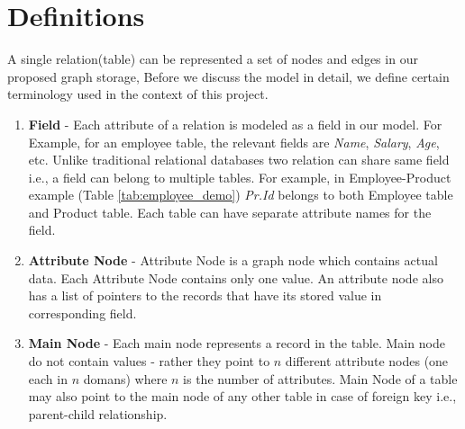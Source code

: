 \documentclass[12pt, oneside]{book}
\begin{document}
\section{Definitions}
A single relation(table) can be represented a set of nodes and edges in our proposed graph storage, Before we discuss the model in detail, we define certain terminology used in the context of this project.
\begin{enumerate}
 \item \textbf{Field} - Each attribute of a relation is modeled as a field in our model. For Example, for an employee table, the relevant fields are \emph{Name}, \emph{Salary}, \emph{Age}, etc. Unlike traditional relational databases two relation can share same field i.e., a field can belong to multiple tables. For example, in Employee-Product example (Table \ref{tab:employee_demo}) \emph{Pr.Id} belongs to both Employee table and Product table. Each table can have separate attribute names for the field.
 \item \textbf{Attribute Node} - Attribute Node is a graph node which contains actual data. Each Attribute Node contains only one value. An attribute node also has a list of pointers to the records that have its stored value in corresponding field.
 \item \textbf{Main Node} - Each main node represents a record in the table. Main node do not contain values - rather they point to $n$ different attribute nodes (one each in $n$ domans) where $n$ is the number of attributes. Main Node of a table may also point to the main node of any other table in case of foreign key i.e., parent-child relationship.
\end{enumerate}
\end{document}
